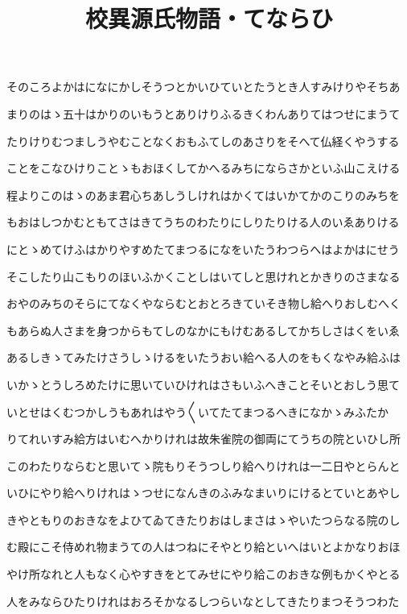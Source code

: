\documentclass[a4paper,11pt,landscape]{ltjtarticle}
\title{校異源氏物語・てならひ}
\date{}
\begin{document}
\maketitle

そのころよかはになにかしそうつとかいひていとたうとき人すみけりやそちあ
\par\medskip
まりのはゝ五十はかりのいもうとありけりふるきくわんありてはつせにまうて
\par\medskip
たりけりむつましうやむことなくおもふてしのあさりをそへて仏経くやうする
\par\medskip
ことをこなひけりことゝもおほくしてかへるみちにならさかといふ山こえける
\par\medskip
程よりこのはゝのあま君心ちあしうしけれはかくてはいかてかのこりのみちを
\par\medskip
もおはしつかむともてさはきてうちのわたりにしりたりける人のいゑありける
\par\medskip
にとゝめてけふはかりやすめたてまつるになをいたうわつらへはよかはにせう
\par\medskip
そこしたり山こもりのほいふかくことしはいてしと思けれとかきりのさまなる
\par\medskip
おやのみちのそらにてなくやならむとおとろきていそき物し給へりおしむへく
\par\medskip
もあらぬ人さまを身つからもてしのなかにもけむあるしてかちしさはくをいゑ
\par\medskip
あるしきゝてみたけさうしゝけるをいたうおい給へる人のをもくなやみ給ふは
\par\medskip
いかゝとうしろめたけに思いていひけれはさもいふへきことそいとおしう思て
\par\medskip
いとせはくむつかしうもあれはやう〱いてたてまつるへきになかゝみふたか
\par\medskip
りてれいすみ給方はいむへかりけれは故朱雀院の御両にてうちの院といひし所
\par\medskip
このわたりならむと思いてゝ院もりそうつしり給へりけれは一二日やとらんと
\par\medskip
いひにやり給へりけれはゝつせになんきのふみなまいりにけるとていとあやし
\par\medskip
きやともりのおきなをよひてゐてきたりおはしまさはゝやいたつらなる院のし
\par\medskip
む殿にこそ侍めれ物まうての人はつねにそやとり給といへはいとよかなりおほ
\par\medskip
やけ所なれと人もなく心やすきをとてみせにやり給このおきな例もかくやとる
\par\medskip
人をみならひたりけれはおろそかなるしつらいなとしてきたりまつそうつわた
\end{document}

